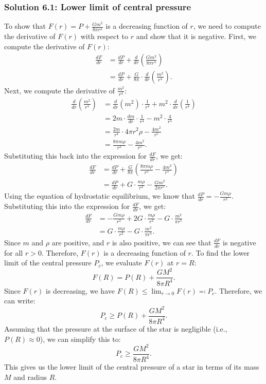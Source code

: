 \subsubsection*{Solution 6.1: Lower limit of central pressure}
To show that $F(r) = P + \frac{Gm^2}{8\pi r^4}$ is a decreasing function of $r$, we need to compute the derivative of $F(r)$ with respect to $r$ and show that it is negative.
First, we compute the derivative of $F(r)$:
\begin{align*}
\frac{dF}{dr} &= \frac{dP}{dr} + \frac{d}{dr}\left(\frac{Gm^2}{8\pi r^4}\right) \\
&= \frac{dP}{dr} + \frac{G}{8\pi} \cdot \frac{d}{dr}\left(\frac{m^2}{r^4}\right).
\end{align*}    
Next, we compute the derivative of $\frac{m^2}{r^4}$:
\begin{align*}  
\frac{d}{dr}\left(\frac{m^2}{r^4}\right) &= \frac{d}{dr}(m^2) \cdot \frac{1}{r^4} + m^2 \cdot \frac{d}{dr}\left(\frac{1}{r^4}\right) \\
&= 2m \cdot \frac{dm}{dr} \cdot \frac{1}{r^4} - m^2 \cdot \frac{4}{r^5} \\
&= \frac{2m}{r^4} \cdot 4\pi r^2 \rho - \frac{4m^2}{r^5} \\
&= \frac{8\pi m \rho}{r^2} - \frac{4m^2}{r^5}.
\end{align*}
Substituting this back into the expression for $\frac{dF}{dr}$, we get:
\begin{align*}  
\frac{dF}{dr} &= \frac{dP}{dr} + \frac{G}{8\pi} \left( \frac{8\pi m \rho}{r^2} - \frac{4m^2}{r^5} \right) \\
&= \frac{dP}{dr} + G \cdot \frac{m \rho}{r^2} - \frac{G m^2}{2\pi r^5}.
\end{align*}
Using the equation of hydrostatic equilibrium, we know that $\frac{dP}{dr} = -\frac{G m \rho}{r^2}$. Substituting this into the expression for $\frac{dF}{dr}$, we get:
\begin{align*}
\frac{dF}{dr} &= -\frac{G m \rho}{r^2} + 2G \cdot \frac{m \rho}{r^2} - G \cdot \frac{m^2}{\pi r^5} \\
&= G \cdot \frac{m \rho}{r^2} - G \cdot \frac{m^2}{\pi r^5}.
\end{align*}
Since $m$ and $\rho$ are positive, and $r$ is also positive, we can see that $\frac{dF}{dr}$ is negative for all $r > 0$. Therefore, $F(r)$ is a decreasing function of $r$.
To find the lower limit of the central pressure $P_c$, we evaluate $F(r)$ at $r = R$:
\begin{equation}
F(R) = P(R) + \frac{G M^2}{8\pi R^4}.
\end{equation}  
Since $F(r)$ is decreasing, we have $F(R) \leq \lim_{r \to 0} F(r) \eqqcolon P_c$. Therefore, we can write:
\begin{equation}
    P_c \geq P(R) + \frac{G M^2}{8\pi R^4}.
\end{equation}
Assuming that the pressure at the surface of the star is negligible (i.e., $P(R) \approx 0$), we can simplify this to:
\begin{equation}
    P_c \geq \frac{G M^2}{8\pi R^4}.
\end{equation}
This gives us the lower limit of the central pressure of a star in terms of its mass $M$ and radius $R$.
